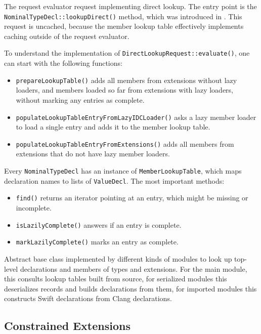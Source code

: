 \documentclass[../generics]{subfiles}
\begin{document}
The request evaluator request implementing direct lookup. The entry point is the \texttt{NominalTypeDecl::lookupDirect()} method, which was introduced in . This request is uncached, because the member lookup table effectively implements caching outside of the request evaluator.

To understand the implementation of \verb|DirectLookupRequest::evaluate()|, one can start with the following functions:
\begin{itemize}
\item \texttt{prepareLookupTable()} adds all members from extensions without lazy loaders, and members loaded so far from extensions with lazy loaders, without marking any entries as complete.
\item \texttt{populateLookupTableEntryFromLazyIDCLoader()} asks a lazy member loader to load a single entry and adds it to the member lookup table.
\item \texttt{populateLookupTableEntryFromExtensions()} adds all members from extensions that do not have lazy member loaders.
\end{itemize}

Every \texttt{NominalTypeDecl} has an instance of \texttt{MemberLookupTable}, which maps declaration names to lists of \texttt{ValueDecl}. The most important methods:
\begin{itemize}
\item \texttt{find()} returns an iterator pointing at an entry, which might be missing or incomplete.
\item \texttt{isLazilyComplete()} answers if an entry is complete.
\item \texttt{markLazilyComplete()} marks an entry as complete.
\end{itemize}

Abstract base class implemented by different kinds of modules to look up top-level declarations and members of types and extensions. For the main module, this consults lookup tables built from source, for serialized modules this deserializes records and builds declarations from them, for imported modules this constructs Swift declarations from Clang declarations.

\subsection*{Constrained Extensions}
\end{document}
